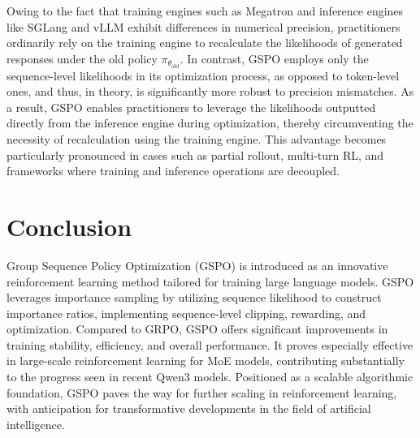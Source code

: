 Owing to the fact that training engines such as Megatron and inference engines like SGLang and vLLM exhibit differences in numerical precision, practitioners ordinarily rely on the training engine to recalculate the likelihoods of generated responses under the old policy $\pi_{\theta_\text{old}}$. In contrast, GSPO employs only the sequence-level likelihoods in its optimization process, as opposed to token-level ones, and thus, in theory, is significantly more robust to precision mismatches. As a result, GSPO enables practitioners to leverage the likelihoods outputted directly from the inference engine during optimization, thereby circumventing the necessity of recalculation using the training engine. This advantage becomes particularly pronounced in cases such as partial rollout, multi-turn RL, and frameworks where training and inference operations are decoupled.

\section{Conclusion}

Group Sequence Policy Optimization (GSPO) is introduced as an innovative reinforcement learning method tailored for training large language models. GSPO leverages importance sampling by utilizing sequence likelihood to construct importance ratios, implementing sequence-level clipping, rewarding, and optimization. Compared to GRPO, GSPO offers significant improvements in training stability, efficiency, and overall performance. It proves especially effective in large-scale reinforcement learning for MoE models, contributing substantially to the progress seen in recent Qwen3 models. Positioned as a scalable algorithmic foundation, GSPO paves the way for further scaling in reinforcement learning, with anticipation for transformative developments in the field of artificial intelligence.

